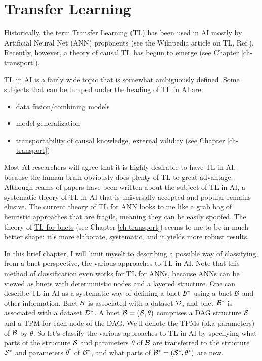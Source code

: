 \chapter{Transfer Learning}
\label{ch-transfer}

Historically,
the term Transfer Learning (TL)
has been used in AI mostly by Artificial Neural Net (ANN)
proponents (see the Wikipedia article on TL,
 Ref.\cite{wiki-TL}).
Recently, however,
 a theory of causal TL
has begun to emerge
(see Chapter \ref{ch-transport}).

TL in AI is a
fairly wide topic that 
is somewhat ambiguously defined.
Some subjects that can be lumped
under the heading of TL in AI are:
\begin{itemize}
\item data fusion/combining models
\item model generalization
\item transportability of 
causal knowledge, external validity
(see Chapter \ref{ch-transport})
\end{itemize}


Most AI researchers
will agree that it is highly desirable 
to have TL in AI, because the human 
brain obviously does  plenty of TL
to great advantage.
Although reams of papers 
have been written about the subject of TL in AI,
a systematic theory of TL in AI
that is universally accepted and popular
remains elusive. The current
theory of \ul{TL for ANN} looks to me 
like a grab bag
of
 heuristic approaches
that are fragile, meaning they
can be easily spoofed.
The theory of \ul{TL for bnets} (see
Chapter \ref{ch-transport})
seems to me to be in much 
better shape: it's more
elaborate,
systematic, and it
yields more robust results.



In this brief chapter, I will
limit myself to describing a possible way of
 classifying,
from a bnet perspective, the 
various approaches to TL
in AI.
Note that this method of classification
even works for TL for ANNs,
because ANNs can be
viewed as bnets with deterministic nodes
and a layered structure.
One can describe TL in AI as 
a systematic way 
of  defining a bnet 
${\cal B}^*$ 
using a bnet 
${\cal B}$
and other information.
Bnet ${\cal B}$ is associated with a dataset ${\cal D}$,
and bnet ${\cal B}^*$
is associated with a dataset ${\cal D}^*$.
A bnet ${\cal B}=({\cal S}, \theta)$ comprises
a DAG structure ${\cal S}$ and 
a TPM for each node of the DAG. We'll denote
the TPMs (aka parameters) of ${\cal B}$ by $\theta$. So let's
classify the various approaches to TL in AI 
by specifying what parts
of the structure ${\cal S}$ and parameters $\theta$
of ${\cal B}$
are transferred to the structure
${\cal S}^*$ and parameters $\theta^*$
of ${\cal B}^*$, and what parts of 
${\cal B}^*=({\cal S}^*, \theta^*)$ are new.

